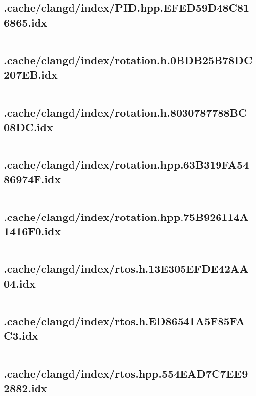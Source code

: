 \subsection{.cache/clangd/index/PID.hpp.EFED59D48C816865.idx}
\inputminted[linenos,tabsize=2,breaklines, breakanywhere]{c}{PID.hpp.EFED59D48C816865.idx}
\pagebreak

\subsection{.cache/clangd/index/rotation.h.0BDB25B78DC207EB.idx}
\inputminted[linenos,tabsize=2,breaklines, breakanywhere]{c}{rotation.h.0BDB25B78DC207EB.idx}
\pagebreak

\subsection{.cache/clangd/index/rotation.h.8030787788BC08DC.idx}
\inputminted[linenos,tabsize=2,breaklines, breakanywhere]{c}{rotation.h.8030787788BC08DC.idx}
\pagebreak

\subsection{.cache/clangd/index/rotation.hpp.63B319FA5486974F.idx}
\inputminted[linenos,tabsize=2,breaklines, breakanywhere]{c}{rotation.hpp.63B319FA5486974F.idx}
\pagebreak

\subsection{.cache/clangd/index/rotation.hpp.75B926114A1416F0.idx}
\inputminted[linenos,tabsize=2,breaklines, breakanywhere]{c}{rotation.hpp.75B926114A1416F0.idx}
\pagebreak

\subsection{.cache/clangd/index/rtos.h.13E305EFDE42AA04.idx}
\inputminted[linenos,tabsize=2,breaklines, breakanywhere]{c}{rtos.h.13E305EFDE42AA04.idx}
\pagebreak

\subsection{.cache/clangd/index/rtos.h.ED86541A5F85FAC3.idx}
\inputminted[linenos,tabsize=2,breaklines, breakanywhere]{c}{rtos.h.ED86541A5F85FAC3.idx}
\pagebreak

\subsection{.cache/clangd/index/rtos.hpp.554EAD7C7EE92882.idx}
\inputminted[linenos,tabsize=2,breaklines, breakanywhere]{c}{rtos.hpp.554EAD7C7EE92882.idx}
\pagebreak

